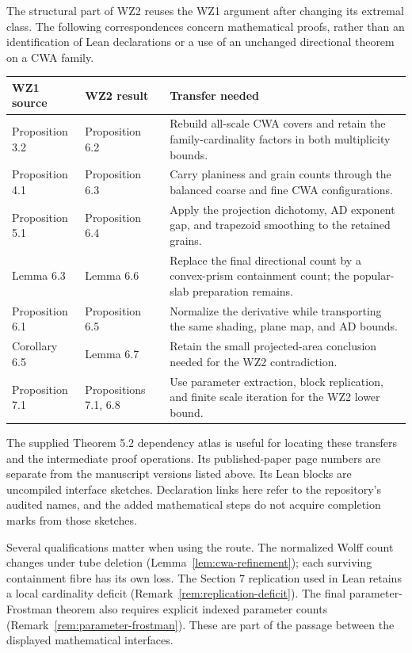 The structural part of WZ2 reuses the WZ1 argument after changing its
extremal class. The following correspondences concern mathematical
proofs, rather than an identification of Lean declarations or a use
of an unchanged directional theorem on a CWA family.

\begin{center}
\begin{tabular}{p{}p{}p{}}
WZ1 source & WZ2 result & Transfer needed \\
\hline
Proposition 3.2 & Proposition 6.2 & Rebuild all-scale CWA covers and
retain the family-cardinality factors in both multiplicity bounds. \\
Proposition 4.1 & Proposition 6.3 & Carry planiness and grain counts
through the balanced coarse and fine CWA configurations. \\
Proposition 5.1 & Proposition 6.4 & Apply the projection dichotomy,
AD exponent gap, and trapezoid smoothing to the retained grains. \\
Lemma 6.3 & Lemma 6.6 & Replace the final directional count by a
convex-prism containment count; the popular-slab preparation remains. \\
Proposition 6.1 & Proposition 6.5 & Normalize the derivative while
transporting the same shading, plane map, and AD bounds. \\
Corollary 6.5 & Lemma 6.7 & Retain the small projected-area conclusion
needed for the WZ2 contradiction. \\
Proposition 7.1 & Propositions 7.1, 6.8 & Use parameter extraction,
block replication, and finite scale iteration for the WZ2 lower bound.
\end{tabular}
\end{center}

The supplied Theorem 5.2 dependency atlas is useful for locating these
transfers and the intermediate proof operations. Its published-paper
page numbers are separate from the manuscript versions listed above.
Its Lean blocks are uncompiled interface sketches. Declaration links
here refer to the repository's audited names, and the added mathematical
steps do not acquire completion marks from those sketches.

Several qualifications matter when using the route. The normalized
Wolff count changes under tube deletion
(Lemma~\ref{lem:cwa-refinement}); each surviving containment fibre
has its own loss. The Section 7 replication used in Lean retains a
local cardinality deficit (Remark~\ref{rem:replication-deficit}).
The final parameter-Frostman theorem also requires explicit indexed
parameter counts (Remark~\ref{rem:parameter-frostman}). These are
part of the passage between the displayed mathematical interfaces.


